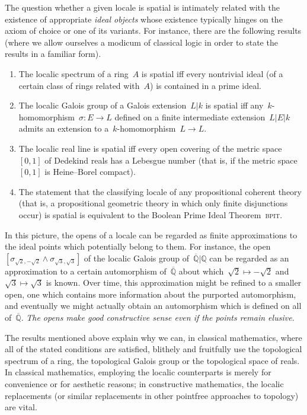 \documentclass{ws-rv9x6}
\newcommand{\QQ}{\mathbb{Q}}
\renewcommand{\_}{\mathpunct{.}}
\newcommand{\?}{\,{:}\,}
\newcommand{\BPIT}{\textsc{bpit}\xspace}
\begin{document}
The question whether a given locale is spatial is intimately related with the
existence of appropriate \emph{ideal objects} whose existence typically hinges
on the axiom of choice or one of its variants. For instance, there are the
following results (where we allow ourselves a modicum of classical logic in
order to state the results in a familiar form).
\begin{enumerate}
\item The localic spectrum of a ring~$A$ is spatial iff every nontrivial ideal
(of a certain class of rings related with~$A$) is contained in a prime ideal.
\item The localic Galois group of a Galois extension~$L|k$ is spatial iff
any~$k$-homomorphism~$\sigma : E \to L$ defined on a finite intermediate
extension~$L|E|k$ admits an extension to a~$k$-homomorphism~$L \to L$.
\item The localic real line is spatial iff every open covering of the
metric space~$[0,1]$ of Dedekind reals has a Lebesgue number (that is, if the
metric space~$[0,1]$ is Heine--Borel compact).
\item The statement that the classifying locale of any propositional coherent
theory (that is, a propositional geometric theory in which only finite
disjunctions occur) is spatial is equivalent to the Boolean Prime Ideal
Theorem~\BPIT.
\end{enumerate}

In this picture, the opens of a locale can be regarded as finite approximations
to the ideal points which potentially belong to them. For instance, the
open~$[\sigma_{\sqrt{2},-\sqrt{2}} \wedge \sigma_{\sqrt{3},\sqrt{3}}]$
of the localic Galois group of~$\overline{\QQ}|\QQ$ can be regarded as an
approximation to a certain automorphism of~$\overline{\QQ}$ about
which~$\sqrt{2} \mapsto -\sqrt{2}$ and~$\sqrt{3} \mapsto \sqrt{3}$ is known. Over time, this
approximation might be refined to a smaller open, one which contains more
information about the purported automorphism, and eventually we might actually
obtain an automorphism which is defined on all of~$\overline{\QQ}$. \emph{The opens
make good constructive sense even if the points remain elusive.}

The results mentioned above explain why we can, in classical mathematics, where all of the stated
conditions are satisfied, blithely and fruitfully use the topological
spectrum of a ring, the topological Galois group or the topological space of
reals. In classical mathematics, employing the localic counterparts is merely
for convenience or for aesthetic reasons; in constructive mathematics, the
localic replacements (or similar replacements in other pointfree approaches to
topology) are vital.
\end{document}

